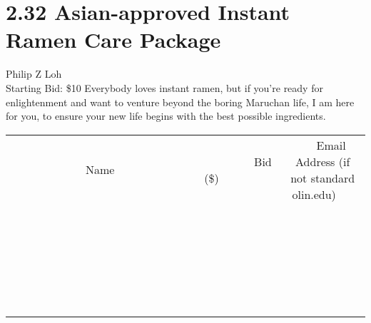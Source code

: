 \documentclass[11pt]{article}
\begin{document}
\section*{2.32 Asian-approved Instant Ramen Care Package}
Philip Z Loh
\\
Starting Bid: \$10
\newline
Everybody loves instant ramen, but if you're ready for enlightenment and want to venture beyond the boring Maruchan life, I am here for you, to ensure your new life begins with the best possible ingredients.
\\[6ex]
\begin{tabular}{c c c}
~~~~~~~~~~~~~Name~~~~~~~~~~~~~ & ~~~~~~~~~Bid (\$)~~~~~~~~~  & ~~~Email Address (if not standard olin.edu)~~~\\
 & & \\
\hline
 & & \\
\hline
 & & \\
\hline
 & & \\
\hline
 & & \\
\hline
 & & \\
\hline
 & & \\
\hline
 & & \\
\hline
 & & \\
\hline
 & & \\
\hline
 & & \\
\hline
 & & \\
\hline
 & & \\
\hline
 & & \\
\hline
 & & \\
\hline
 & & \\
\hline
 & & \\
\hline
 & & \\
\hline
 & & \\
\hline
 & & \\
\hline
 & & \\
\hline
 & & \\
\hline
 & & \\
\hline
 & & \\
\hline
 & & \\
\hline
 & & \\
\hline
\end{tabular}
\newpage
\end{document}
